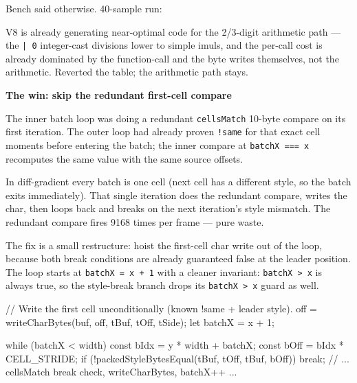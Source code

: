 Bench said otherwise. 40-sample run:



V8 is already generating near-optimal code for the 2/3-digit arithmetic path --- the \texttt{|\allowbreak{} \allowbreak{}0} integer-cast divisions lower to simple imuls, and the per-call cost is already dominated by the function-call and the byte writes themselves, not the arithmetic. Reverted the table; the arithmetic path stays.

\textbf{The win: skip the redundant first-cell compare}

The inner batch loop was doing a redundant \texttt{c\allowbreak{}e\allowbreak{}l\allowbreak{}l\allowbreak{}s\allowbreak{}M\allowbreak{}a\allowbreak{}t\allowbreak{}c\allowbreak{}h} 10-byte compare on its first iteration. The outer loop had already proven \texttt{!\allowbreak{}s\allowbreak{}a\allowbreak{}m\allowbreak{}e} for that exact cell moments before entering the batch; the inner compare at \texttt{b\allowbreak{}a\allowbreak{}t\allowbreak{}c\allowbreak{}h\allowbreak{}X\allowbreak{} \allowbreak{}=\allowbreak{}=\allowbreak{}=\allowbreak{} \allowbreak{}x} recomputes the same value with the same source offsets.

In diff-gradient every batch is one cell (next cell has a different style, so the batch exits immediately). That single iteration does the redundant compare, writes the char, then loops back and breaks on the next iteration's style mismatch. The redundant compare fires 9168 times per frame --- pure waste.

The fix is a small restructure: hoist the first-cell char write out of the loop, because both break conditions are already guaranteed false at the leader position. The loop starts at \texttt{b\allowbreak{}a\allowbreak{}t\allowbreak{}c\allowbreak{}h\allowbreak{}X\allowbreak{} \allowbreak{}=\allowbreak{} \allowbreak{}x\allowbreak{} \allowbreak{}+\allowbreak{} \allowbreak{}1} with a cleaner invariant: \texttt{b\allowbreak{}a\allowbreak{}t\allowbreak{}c\allowbreak{}h\allowbreak{}X\allowbreak{} \allowbreak{}>\allowbreak{} \allowbreak{}x} is always true, so the style-break branch drops its \texttt{b\allowbreak{}a\allowbreak{}t\allowbreak{}c\allowbreak{}h\allowbreak{}X\allowbreak{} \allowbreak{}>\allowbreak{} \allowbreak{}x} guard as well.

\begin{CodeBlock}
// Write the first cell unconditionally (known !same + leader style).
off = writeCharBytes(buf, off, tBuf, tOff, tSide);
let batchX = x + 1;

while (batchX < width) {
  const bIdx = y * width + batchX;
  const bOff = bIdx * CELL_STRIDE;
  if (!packedStyleBytesEqual(tBuf, tOff, tBuf, bOff)) break;
  // ... cellsMatch break check, writeCharBytes, batchX++ ...
}
\end{CodeBlock}

